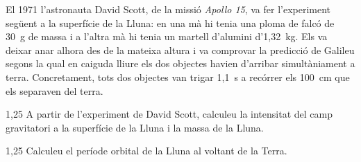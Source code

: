 El 1971 l'astronauta David Scott, de la missió \textit{Apollo 15}, va fer l'experiment següent a la superfície de la Lluna: en una mà hi tenia una ploma de falcó de 30~g de massa i a l'altra mà hi tenia un martell d'alumini d'1,32~kg. Els va deixar anar alhora des de la mateixa altura i va comprovar la predicció de Galileu segons la qual en caiguda lliure els dos objectes havien d'arribar simultàniament a terra. Concretament, tots dos objectes van trigar 1,1~s a recórrer els 100~cm que els separaven del terra.

\begin{apartat}{1,25}
A partir de l'experiment de David Scott, calculeu la intensitat del camp gravitatori a la superfície de la Lluna i la massa de la Lluna.
\end{apartat}

\begin{apartat}{1,25}
Calculeu el període orbital de la Lluna al voltant de la Terra.
\end{apartat}


